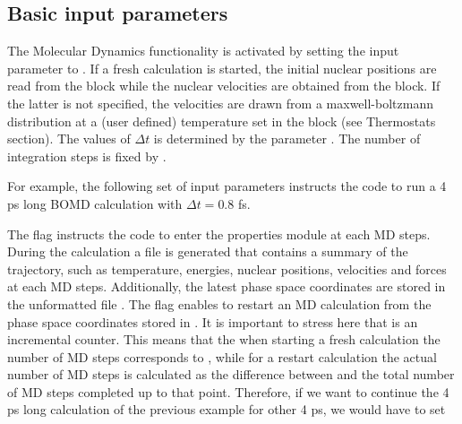 \documentclass[letterpaper,10pt,english]{sphinxmanual}
\begin{document}
\subsection{Basic input parameters}
\label{\detokenize{BOMD:basic-input-parameters}}
The Molecular Dynamics functionality is activated by setting the input
parameter  to . If a fresh calculation is
started, the initial nuclear positions are read from the
 block while the nuclear velocities are obtained from
the  block. If the latter is not specified, the velocities
are drawn from a maxwell-boltzmann distribution at a (user defined)
temperature set in the  block (see Thermostats section).
The values of \(\Delta t\) is determined by the parameter
. The number of integration steps is fixed by
.

For example, the following set of input parameters instructs the code to
run a 4 ps long BOMD calculation with \(\Delta t = 0.8\) fs.

%
\begin{sphinxVerbatim}[commandchars=\\\{\}]
            
       
     
   
      
\end{sphinxVerbatim}

The flag  instructs the code to enter the properties
module at each MD steps. During the calculation a file 
is generated that contains a summary of the trajectory, such as
temperature, energies, nuclear positions, velocities and forces at each
MD steps. Additionally, the latest phase space coordinates are stored in
the unformatted file . The flag 
enables to restart an MD calculation from the phase space coordinates
stored in . It is important to stress here that
 is an incremental counter. This means that the when
starting a fresh calculation the number of MD steps corresponds to
, while for a restart calculation the actual number of MD
steps is calculated as the difference between  and the
total number of MD steps completed up to that point. Therefore, if we
want to continue the 4 ps long calculation of the previous example for
other 4 ps, we would have to set
\end{document}
